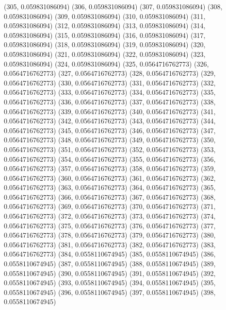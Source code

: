 {					(305, 0.059831086094)
					(306, 0.059831086094)
					(307, 0.059831086094)
					(308, 0.059831086094)
					(309, 0.059831086094)
					(310, 0.059831086094)
					(311, 0.059831086094)
					(312, 0.059831086094)
					(313, 0.059831086094)
					(314, 0.059831086094)
					(315, 0.059831086094)
					(316, 0.059831086094)
					(317, 0.059831086094)
					(318, 0.059831086094)
					(319, 0.059831086094)
					(320, 0.059831086094)
					(321, 0.059831086094)
					(322, 0.059831086094)
					(323, 0.059831086094)
					(324, 0.059831086094)
					(325, 0.0564716762773)
					(326, 0.0564716762773)
					(327, 0.0564716762773)
					(328, 0.0564716762773)
					(329, 0.0564716762773)
					(330, 0.0564716762773)
					(331, 0.0564716762773)
					(332, 0.0564716762773)
					(333, 0.0564716762773)
					(334, 0.0564716762773)
					(335, 0.0564716762773)
					(336, 0.0564716762773)
					(337, 0.0564716762773)
					(338, 0.0564716762773)
					(339, 0.0564716762773)
					(340, 0.0564716762773)
					(341, 0.0564716762773)
					(342, 0.0564716762773)
					(343, 0.0564716762773)
					(344, 0.0564716762773)
					(345, 0.0564716762773)
					(346, 0.0564716762773)
					(347, 0.0564716762773)
					(348, 0.0564716762773)
					(349, 0.0564716762773)
					(350, 0.0564716762773)
					(351, 0.0564716762773)
					(352, 0.0564716762773)
					(353, 0.0564716762773)
					(354, 0.0564716762773)
					(355, 0.0564716762773)
					(356, 0.0564716762773)
					(357, 0.0564716762773)
					(358, 0.0564716762773)
					(359, 0.0564716762773)
					(360, 0.0564716762773)
					(361, 0.0564716762773)
					(362, 0.0564716762773)
					(363, 0.0564716762773)
					(364, 0.0564716762773)
					(365, 0.0564716762773)
					(366, 0.0564716762773)
					(367, 0.0564716762773)
					(368, 0.0564716762773)
					(369, 0.0564716762773)
					(370, 0.0564716762773)
					(371, 0.0564716762773)
					(372, 0.0564716762773)
					(373, 0.0564716762773)
					(374, 0.0564716762773)
					(375, 0.0564716762773)
					(376, 0.0564716762773)
					(377, 0.0564716762773)
					(378, 0.0564716762773)
					(379, 0.0564716762773)
					(380, 0.0564716762773)
					(381, 0.0564716762773)
					(382, 0.0564716762773)
					(383, 0.0564716762773)
					(384, 0.0558110674945)
					(385, 0.0558110674945)
					(386, 0.0558110674945)
					(387, 0.0558110674945)
					(388, 0.0558110674945)
					(389, 0.0558110674945)
					(390, 0.0558110674945)
					(391, 0.0558110674945)
					(392, 0.0558110674945)
					(393, 0.0558110674945)
					(394, 0.0558110674945)
					(395, 0.0558110674945)
					(396, 0.0558110674945)
					(397, 0.0558110674945)
					(398, 0.0558110674945)
}
